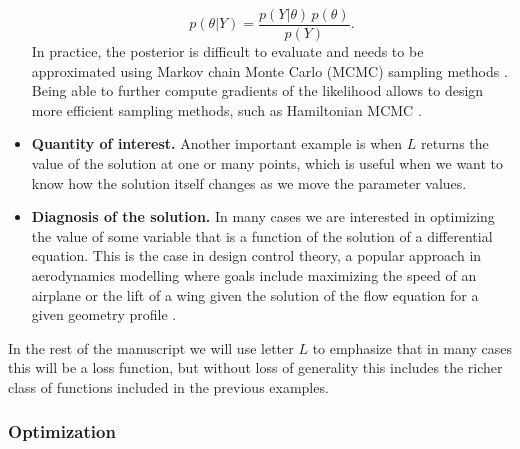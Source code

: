 \begin{itemize}
    \begin{equation}
        p(\theta | Y) = \frac{p(Y | \theta) \, p (\theta)}{p(Y)}. 
    \end{equation}
    In practice, the posterior is difficult to evaluate and needs to be approximated using Markov chain Monte Carlo (MCMC) sampling methods \cite{gelman2013bayesian}. Being able to further compute gradients of the likelihood allows to design more efficient sampling methods, such as Hamiltonian MCMC \cite{Betancourt_2017}.
    \item \textbf{Quantity of interest.} Another important example is when $L$ returns the value of the solution at one or many points, which is useful when we want to know how the solution itself changes as we move the parameter values. 
    \item \textbf{Diagnosis of the solution.} In many cases we are interested in optimizing the value of some variable that is a function of the solution of a differential equation. This is the case in design control theory, a popular approach in aerodynamics modelling where goals include maximizing the speed of an airplane or the lift of a wing given the solution of the flow equation for a given geometry profile \cite{Jameson_1988,Giles:2000wp,Mohammadi:2004dg}. 
\end{itemize}
In the rest of the manuscript we will use letter $L$ to emphasize that in many cases this will be a loss function, but without loss of generality this includes the richer class of functions included in the previous examples. 

\subsubsection{Optimization}

